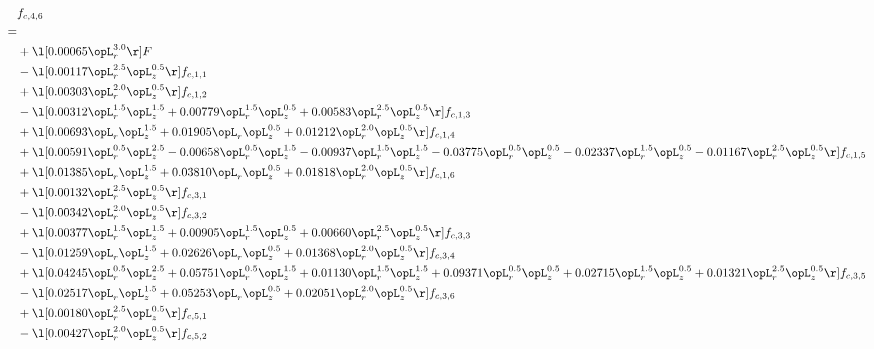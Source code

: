 \begin{alignat}{2} 
\label{eq:f_46_1} 
& f_{c,4,6} \nonumber \\ 
 = \\ 
& + \l[  0.00065 \opL_r^{3.0}  \r] F \nonumber \\ 
& - \l[  0.00117 \opL_r^{2.5} \opL_z^{0.5}  \r] f_{c,1,1} \nonumber \\ 
& + \l[  0.00303 \opL_r^{2.0} \opL_z^{0.5}  \r] f_{c,1,2} \nonumber \\ 
& - \l[  0.00312 \opL_r^{1.5} \opL_z^{1.5} +  0.00779 \opL_r^{1.5} \opL_z^{0.5} +  0.00583 \opL_r^{2.5} \opL_z^{0.5}  \r] f_{c,1,3} \nonumber \\ 
& + \l[  0.00693 \opL_r \opL_z^{1.5} +  0.01905 \opL_r \opL_z^{0.5} +  0.01212 \opL_r^{2.0} \opL_z^{0.5}  \r] f_{c,1,4} \nonumber \\ 
& + \l[  0.00591 \opL_r^{0.5} \opL_z^{2.5}   -0.00658 \opL_r^{0.5} \opL_z^{1.5}   -0.00937 \opL_r^{1.5} \opL_z^{1.5}   -0.03775 \opL_r^{0.5} \opL_z^{0.5}   -0.02337 \opL_r^{1.5} \opL_z^{0.5}   -0.01167 \opL_r^{2.5} \opL_z^{0.5}  \r] f_{c,1,5} \nonumber \\ 
& + \l[  0.01385 \opL_r \opL_z^{1.5} +  0.03810 \opL_r \opL_z^{0.5} +  0.01818 \opL_r^{2.0} \opL_z^{0.5}  \r] f_{c,1,6} \nonumber \\ 
& + \l[  0.00132 \opL_r^{2.5} \opL_z^{0.5}  \r] f_{c,3,1} \nonumber \\ 
& - \l[  0.00342 \opL_r^{2.0} \opL_z^{0.5}  \r] f_{c,3,2} \nonumber \\ 
& + \l[  0.00377 \opL_r^{1.5} \opL_z^{1.5} +  0.00905 \opL_r^{1.5} \opL_z^{0.5} +  0.00660 \opL_r^{2.5} \opL_z^{0.5}  \r] f_{c,3,3} \nonumber \\ 
& - \l[  0.01259 \opL_r \opL_z^{1.5} +  0.02626 \opL_r \opL_z^{0.5} +  0.01368 \opL_r^{2.0} \opL_z^{0.5}  \r] f_{c,3,4} \nonumber \\ 
& + \l[  0.04245 \opL_r^{0.5} \opL_z^{2.5} +  0.05751 \opL_r^{0.5} \opL_z^{1.5} +  0.01130 \opL_r^{1.5} \opL_z^{1.5} +  0.09371 \opL_r^{0.5} \opL_z^{0.5} +  0.02715 \opL_r^{1.5} \opL_z^{0.5} +  0.01321 \opL_r^{2.5} \opL_z^{0.5}  \r] f_{c,3,5} \nonumber \\ 
& - \l[  0.02517 \opL_r \opL_z^{1.5} +  0.05253 \opL_r \opL_z^{0.5} +  0.02051 \opL_r^{2.0} \opL_z^{0.5}  \r] f_{c,3,6} \nonumber \\ 
& + \l[  0.00180 \opL_r^{2.5} \opL_z^{0.5}  \r] f_{c,5,1} \nonumber \\ 
& - \l[  0.00427 \opL_r^{2.0} \opL_z^{0.5}  \r] f_{c,5,2} \nonumber \\ 

\end{alignat}
